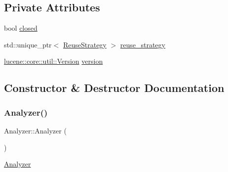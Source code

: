 \subsection*{Private Attributes}
\begin{DoxyCompactItemize}
\item 
bool \mbox{\hyperlink{classlucene_1_1core_1_1analysis_1_1Analyzer_a869f08194af89da7f8c68e211d73607c}{closed}}
\item 
std\+::unique\+\_\+ptr$<$ \mbox{\hyperlink{classlucene_1_1core_1_1analysis_1_1Analyzer_1_1ReuseStrategy}{Reuse\+Strategy}} $>$ \mbox{\hyperlink{classlucene_1_1core_1_1analysis_1_1Analyzer_a8c0924436e0392015b0b3df59d35717c}{reuse\+\_\+strategy}}
\item 
\mbox{\hyperlink{classlucene_1_1core_1_1util_1_1Version}{lucene\+::core\+::util\+::\+Version}} \mbox{\hyperlink{classlucene_1_1core_1_1analysis_1_1Analyzer_ab22f6dcf3510458172e2167ddf85fdd8}{version}}
\end{DoxyCompactItemize}


\subsection{Constructor \& Destructor Documentation}
\mbox{\label{classlucene_1_1core_1_1analysis_1_1Analyzer_a1be2ff17bba265bdef6e1b44748eaf96}} 
\subsubsection{\texorpdfstring{Analyzer()}{Analyzer()}\hspace{0.1cm}{\footnotesize\ttfamily [1/2]}}
{\footnotesize\ttfamily Analyzer\+::\+Analyzer (\begin{DoxyParamCaption}{ }\end{DoxyParamCaption})}

\mbox{\hyperlink{classlucene_1_1core_1_1analysis_1_1Analyzer}{Analyzer}} \mbox{\label{classlucene_1_1core_1_1analysis_1_1Analyzer_ae9dc5c7b575e336b14185cf403003bba}} 
